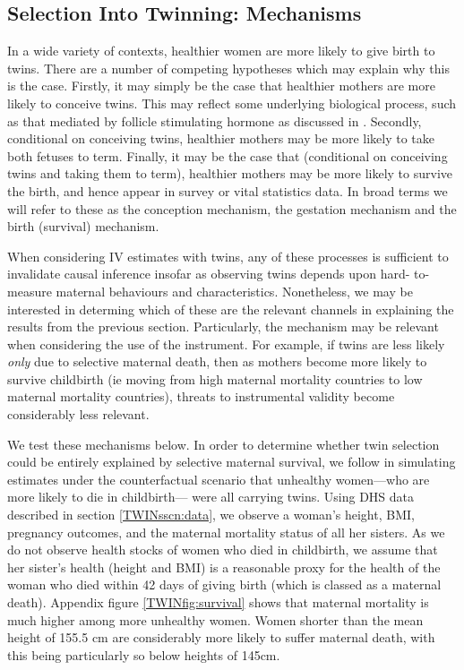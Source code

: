 \subsection{Selection Into Twinning: Mechanisms}   \label{TWINsscn:selection}
In a wide variety of contexts, healthier women are more likely to give birth to
twins.  There are a number of competing hypotheses which may explain why this is
the case.  Firstly, it may simply be the case that healthier mothers are more 
likely to conceive twins.  This may reflect some underlying biological process, 
such as that mediated by follicle stimulating hormone as discussed in 
\citet{Hall2003}.  Secondly, conditional on conceiving twins, healthier mothers 
may be more likely to take both fetuses to term.  Finally, it may be the case 
that (conditional on conceiving twins and taking them to term), healthier mothers 
may be more likely to survive the birth, and hence appear in survey or vital 
statistics data.  In broad terms we will refer to these as the conception 
mechanism, the gestation mechanism and the birth (survival) mechanism.

When considering IV estimates with twins, any of these processes is sufficient 
to invalidate causal inference insofar as observing twins depends upon hard-%
to-measure maternal behaviours and characteristics.  Nonetheless, we may be 
interested in determing which of these are the relevant channels in explaining 
the results from the previous section.  Particularly, the mechanism may be 
relevant when considering the use of the instrument.  For example, if twins are 
less likely \emph{only} due to selective maternal death, then as mothers become 
more likely to survive childbirth (ie moving from high maternal mortality 
countries to low maternal mortality countries), threats to instrumental validity 
become considerably less relevant.

We test these mechanisms below.  In order to determine whether twin selection
could be entirely explained by selective maternal survival, we follow 
\citet{Aldermanetal2011} in simulating estimates under the counterfactual 
scenario that unhealthy women---who are more likely to die in childbirth---%
were all carrying twins. Using DHS data described in section 
\ref{TWINsscn:data}, we observe a woman's height, BMI, pregnancy outcomes, and 
the maternal mortality status of all her sisters.  As we do not observe health 
stocks of women who died in childbirth, we assume that her sister's health 
(height and BMI) is a reasonable proxy for the health of the woman who died 
within 42 days of giving birth (which is classed as a maternal death).  Appendix 
figure \ref{TWINfig:survival} shows that maternal mortality is much higher among 
more unhealthy women.  Women shorter than the mean height of 155.5 cm are 
considerably more likely to suffer maternal death, with this being particularly 
so below heights of 145cm.

